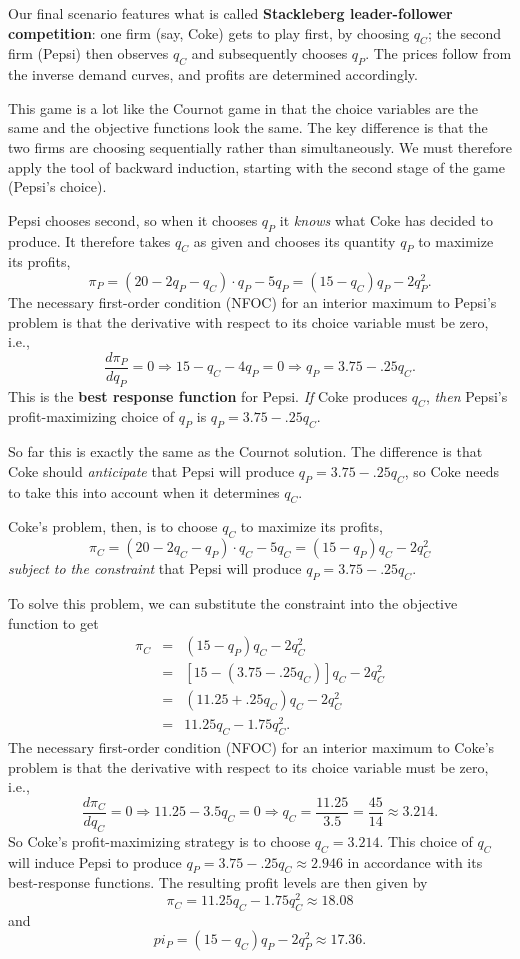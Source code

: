 Our final scenario features what is called \textbf{Stackleberg leader-follower competition}: one firm (say, Coke) gets to play first, by choosing $q_C$; the second firm (Pepsi) then observes $q_C$ and subsequently chooses $q_P$. The prices follow from the inverse demand curves, and profits are determined accordingly.

This game is a lot like the Cournot game in that the choice variables are the same and the objective functions look the same. The key difference is that the two firms are choosing sequentially rather than simultaneously. We must therefore apply the tool of backward induction, starting with the second stage of the game (Pepsi's choice).

Pepsi chooses second, so when it chooses $q_P$ it \emph{knows} what Coke has decided to produce. It therefore takes $q_C$ as given and chooses its quantity $q_P$ to maximize its profits,
\[
\pi_P = (20-2q_P-q_C)\cdot q_P - 5q_P = (15-q_C)q_P - 2 q_P^2.
\]
The necessary first-order condition (NFOC) for an interior maximum to Pepsi's problem is that the derivative with respect to its choice variable must be zero, i.e.,
\[
\frac{d\pi_P}{d q_P}=0\Longrightarrow 15-q_C-4q_P=0\Longrightarrow q_P=3.75-.25q_C.
\]
This is the \textbf{best response function} for Pepsi. \emph{If} Coke produces $q_C$, \emph{then} Pepsi's profit-maximizing choice of $q_P$ is $q_P=3.75-.25q_C$.

So far this is exactly the same as the Cournot solution. The difference is that Coke should \emph{anticipate} that Pepsi will produce $q_P=3.75-.25q_C$, so Coke needs to take this into account when it determines $q_C$.

Coke's problem, then, is to choose $q_C$ to maximize its profits,
\[
\pi_C  =  (20-2q_C-q_P)\cdot q_C - 5q_C = (15-q_P)q_C - 2 q_C^2
\]
\emph{subject to the constraint} that Pepsi will produce $q_P=3.75-.25q_C$.

To solve this problem, we can substitute the constraint into the objective function to get
\begin{eqnarray*}
\pi_C & = & (15-q_P)q_C - 2 q_C^2\\
& = & [15-(3.75-.25q_C)]q_C-2q_C^2\\
& = & (11.25+.25q_C)q_C-2q_C^2\\
& = & 11.25q_C-1.75q_C^2.
\end{eqnarray*}
The necessary first-order condition (NFOC) for an interior maximum to Coke's problem is that the derivative with respect to its choice variable must be zero, i.e.,
\[
\frac{d\pi_C}{d q_C}=0\Longrightarrow 11.25-3.5q_C=0\Longrightarrow q_C=\frac{11.25}{3.5}=\frac{45}{14}\approx 3.214.
\]
So Coke's profit-maximizing strategy is to choose $q_C=3.214$. This choice of $q_C$ will induce Pepsi to produce
$q_P=3.75-.25q_C\approx 2.946$ in accordance with its best-response functions. The resulting profit levels are then given by
\[
\pi_C=11.25q_C-1.75q_C^2\approx 18.08
\]
and
\[
pi_P=(15-q_C)q_P - 2 q_P^2\approx 17.36.
\]

